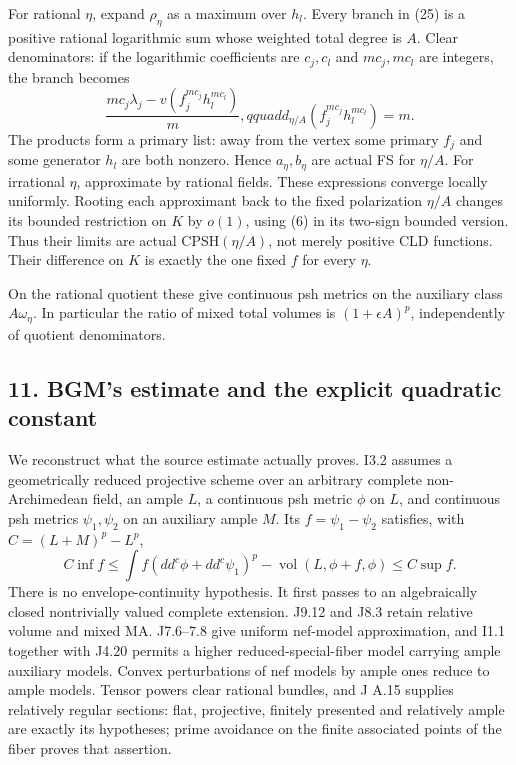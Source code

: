 \documentclass[
  11pt,
]{article}
\begin{document}
For rational \(\eta\), expand \(\rho_\eta\) as a maximum over \(h_l\).
Every branch in (25) is a positive rational logarithmic sum whose
weighted total degree is \(A\). Clear denominators: if the logarithmic
coefficients are \(c_j,c_l\) and \(m c_j,m c_l\) are integers, the
branch becomes \[ \frac{m c_j\lambda_j-v(f_j^{mc_j}h_l^{mc_l})}{m},qquad
 d_{\eta/A}(f_j^{mc_j}h_l^{mc_l})=m.\] The products form a primary list:
away from the vertex some primary \(f_j\) and some generator \(h_l\) are
both nonzero. Hence \(a_\eta,b_\eta\) are actual FS for \(\eta/A\). For
irrational \(\eta\), approximate by rational fields. These expressions
converge locally uniformly. Rooting each approximant back to the fixed
polarization \(\eta/A\) changes its bounded restriction on \(K\) by
\(o(1)\), using (6) in its two-sign bounded version. Thus their limits
are actual CPSH\((\eta/A)\), not merely positive CLD functions. Their
difference on \(K\) is exactly the one fixed \(f\) for every \(\eta\).

On the rational quotient these give continuous psh metrics on the
auxiliary class \(A\omega_\eta\). In particular the ratio of mixed total
volumes is \((1+\epsilon A)^p\), independently of quotient denominators.

\subsection{11. BGM's estimate and the explicit quadratic
constant}\label{bgms-estimate-and-the-explicit-quadratic-constant}

We reconstruct what the source estimate actually proves. I3.2 assumes a
geometrically reduced projective scheme over an arbitrary complete
non-Archimedean field, an ample \(L\), a continuous psh metric \(\phi\)
on \(L\), and continuous psh metrics \(\psi_1,\psi_2\) on an auxiliary
ample \(M\). Its \(f=\psi_1-\psi_2\) satisfies, with \(C=(L+M)^p-L^p\),
\[ C\inf f\leq\int f(dd^c\phi+dd^c\psi_1)^p
                -\operatorname{vol}(L,\phi+f,\phi)\leq C\sup f.         \tag{26}\]
There is no envelope-continuity hypothesis. It first passes to an
algebraically closed nontrivially valued complete extension. J9.12 and
J8.3 retain relative volume and mixed MA. J7.6--7.8 give uniform
nef-model approximation, and I1.1 together with J4.20 permits a higher
reduced-special-fiber model carrying ample auxiliary models. Convex
perturbations of nef models by ample ones reduce to ample models. Tensor
powers clear rational bundles, and J A.15 supplies relatively regular
sections: flat, projective, finitely presented and relatively ample are
exactly its hypotheses; prime avoidance on the finite associated points
of the fiber proves that assertion.
\end{document}
